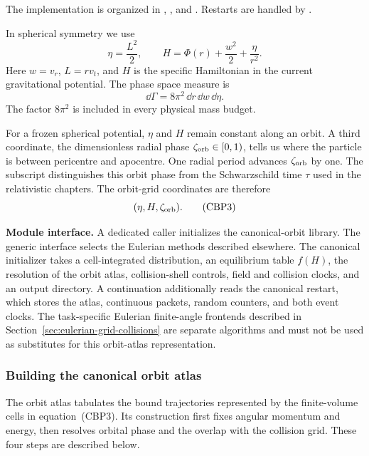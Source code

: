 The implementation is organized in
,
, and
.  Restarts are handled by
.

In spherical symmetry we use
\[
  \eta=\frac{L^2}{2},\qquad
  H=\Phi(r)+\frac{w^2}{2}+\frac{\eta}{r^2}.             \tag{CBP1}
\]
Here \(w=v_r\), \(L=r v_t\), and \(H\) is the specific Hamiltonian in the
current gravitational potential.  The phase space measure is
\[
  \dd\Gamma=8\pi^2\,\dd r\,\dd w\,\dd\eta.             \tag{CBP2}
\]
The factor \(8\pi^2\) is included in every physical mass budget.

For a frozen spherical potential, \(\eta\) and \(H\) remain constant along an
orbit.  A third coordinate, the dimensionless radial phase
\(\zeta_{\rm orb}\in[0,1)\), tells us where the particle is between
pericentre and apocentre.  One radial period advances \(\zeta_{\rm orb}\) by
one.  The subscript distinguishes this orbit phase from the Schwarzschild time
\(\tau\) used in the relativistic chapters.  The orbit-grid coordinates are
therefore
\[
  (\eta,H,\zeta_{\rm orb}).                             \tag{CBP3}
\]

\noindent\textbf{Module interface.}
A dedicated caller initializes the canonical-orbit library.  The generic
 interface selects the Eulerian methods described elsewhere.
The canonical initializer takes a cell-integrated distribution, an equilibrium
table \(f(H)\), the resolution of the orbit atlas, collision-shell controls,
field and collision clocks, and an output directory.  A continuation additionally reads the canonical restart,
which stores the atlas, continuous packets, random counters, and both event
clocks.  The task-specific Eulerian finite-angle frontends described in
Section~\ref{sec:eulerian-grid-collisions} are separate algorithms and must
not be used as substitutes for this orbit-atlas representation.

\subsubsection{Building the canonical orbit atlas}

The orbit atlas tabulates the bound trajectories represented by the
finite-volume cells in equation~(CBP3).  Its construction first fixes angular
momentum and energy, then resolves orbital phase and the overlap with the
collision grid.  These four steps are described below.

